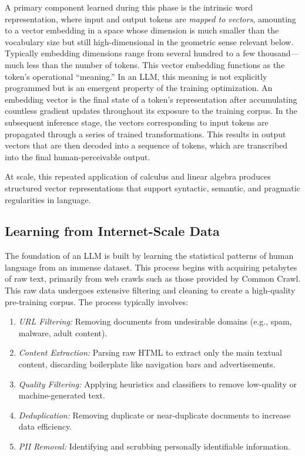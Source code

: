 \documentclass[%
  reprint,
  superscriptaddress,
  showpacs,
  showkeys,
  amsmath,amssymb,
  pra,
  longbibliography,
  floatfix,
  x11names
]{revtex4-2}
\begin{document}
A primary component learned during this phase is the intrinsic word representation,
where input and output tokens are \textit{mapped to vectors}, amounting to a vector embedding in a space whose dimension is much smaller than the vocabulary size but still high-dimensional in the geometric sense relevant below.
Typically embedding dimensions range from several hundred to a few thousand---much less than the number of tokens.
This vector embedding functions as the token's operational ``meaning.''
In an LLM, this meaning is not explicitly programmed but is an emergent property of the training optimization.
An embedding vector is the final state of a token's representation after accumulating countless gradient updates
throughout its exposure to the training corpus.
In the subsequent inference stage, the vectors corresponding to input tokens are propagated through a series of trained transformations.
This results in output vectors that are then decoded into a sequence of tokens,
which are transcribed into the final human-perceivable output.


At scale, this repeated application of calculus and linear algebra produces structured vector representations that support syntactic, semantic, and pragmatic regularities in language.


\subsection{Learning from Internet-Scale Data}

The foundation of an LLM is built by learning the statistical patterns of human language from an immense dataset.
This process begins with acquiring petabytes of raw text, primarily from web crawls such as those provided by Common Crawl. This raw data undergoes extensive filtering and cleaning to create a high-quality pre-training corpus. The process typically involves:
\begin{enumerate}
    \item \textit{URL Filtering:} Removing documents from undesirable domains (e.g., spam, malware, adult content).
    \item \textit{Content Extraction:} Parsing raw HTML to extract only the main textual content, discarding boilerplate like navigation bars and advertisements.
    \item \textit{Quality Filtering:} Applying heuristics and classifiers to remove low-quality or machine-generated text.
    \item \textit{Deduplication:} Removing duplicate or near-duplicate documents to increase data efficiency.
    \item \textit{PII Removal:} Identifying and scrubbing personally identifiable information.
\end{enumerate}
\end{document}
